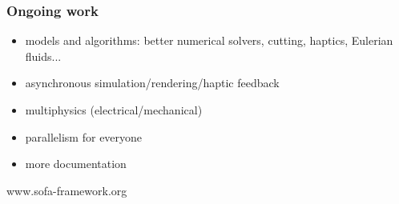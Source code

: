 \documentclass[a4paper,compress]{beamer}
\begin{document}
\begin{frame}
\frametitle{Ongoing work}
\begin{itemize}
\item models and algorithms: better numerical solvers, cutting, haptics, Eulerian fluids...
\item asynchronous simulation/rendering/haptic feedback 
\item multiphysics (electrical/mechanical)
\item parallelism for everyone
\item more documentation
\end{itemize}
% 

\vspace{1cm}
\begin{center}
\Large
 www.sofa-framework.org
\end{center}


\end{frame}
\end{document}
